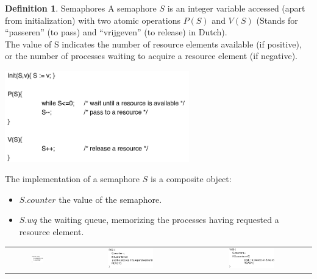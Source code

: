 \documentclass{article}
\theoremstyle{definition}
\newtheorem{definition}{Definition}[section]
\begin{document}
\begin{definition}{Semaphores}
A semaphore $S$ is an integer variable accessed (apart from initialization) with two atomic operations $P(S)$ and $V(S)$ (Stands for “passeren” (to pass) and “vrijgeven” (to release) in Dutch).\\
The value of S indicates the number of resource elements available (if positive), or the number of processes waiting to acquire a resource element (if negative).
\begin{center}
	\includegraphics[width=0.6\textwidth]{semaphore}
\end{center}
\end{definition}

The implementation of a semaphore $S$ is a composite object: 
\begin{itemize}
	\item $S.counter$ the value of the semaphore.
	\item $S.wq$ the waiting queue, memorizing the processes having requested a resource element.
\end{itemize}

\begin{center}
\begin{tabular}{c c c}
\includegraphics[width=0.2\textwidth]{sema_init} &
\includegraphics[width=0.4\textwidth]{sema_P} &
\includegraphics[width=0.4\textwidth]{sema_V}
\end{tabular}
\end{center}
\end{document}
